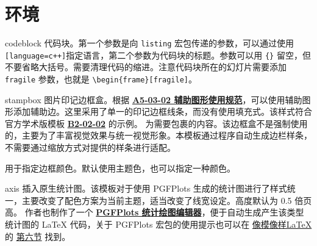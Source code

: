 \documentclass[a4paper,12pt]{article}
\begin{document}

\section{环境}

\begin{docEnvironment*}[doc parameter=\oarg{listing options}\marg{title}, doclang/environment content=code]{codeblock}{}
    代码块。第一个参数是向 \verb"listing" 宏包传递的参数，可以通过使用 \verb"[language=c++]"指定语言，第二个参数为代码块的标题。参数可以用 \verb"{}" 留空，但不要省略大括号。需要清理代码的缩进。注意代码块所在的幻灯片需要添加 \verb"fragile" 参数，也就是 \verb"\begin{frame}[fragile]"。
\end{docEnvironment*}

\begin{docEnvironment*}[doclang/environment content=code]{stampbox}{}
    图片印记边框盒。根据 \href{http://vi.sjtu.edu.cn/index.php/articles/base/5}{\textbf{A5-03-02 辅助图形使用规范}}，可以使用辅助图形添加辅助边。这里采用了单一的印记边框线条，而没有使用填充式。该样式符合官方学术版模板 \href{http://vi.sjtu.edu.cn/index.php/articles/app/8}{\textbf{B2-02-02}} 的示例。 为需要包裹的内容。该边框盒不是强制使用的，主要为了丰富视觉效果与统一视觉形象。本模板通过程序自动生成边栏样条，不需要通过缩放方式对提供的样条进行适配。

     用于指定边框颜色。默认使用主题色，也可以指定一种颜色。
\end{docEnvironment*}

\begin{docEnvironment*}[doclang/environment content=code]{axis}{}
    插入原生统计图。该模板对于使用 \textsf{PGFPlots} 生成的统计图进行了样式统一，主要改变了配色方案为当前主题，适当改变了线宽设定。高度默认为 0.5 倍页高。
    作者也制作了一个 \href{https://logcreative.github.io/PGFPlotsEdt/index.html?lang=cn}{\textbf{PGFPlots 统计绘图编辑器}}，便于自动生成产生该类型统计图的 \LaTeX{} 代码，关于 \textsf{PGFPlots} 宏包的使用提示也可以在 \href{https://logcreative.github.io/LaTeXSparkle/}{像模像样\LaTeX} 的 \href{https://logcreative.github.io/LaTeXSparkle/src/art/chapter06.html}{第六节} 找到。
\end{docEnvironment*}
\end{document}
